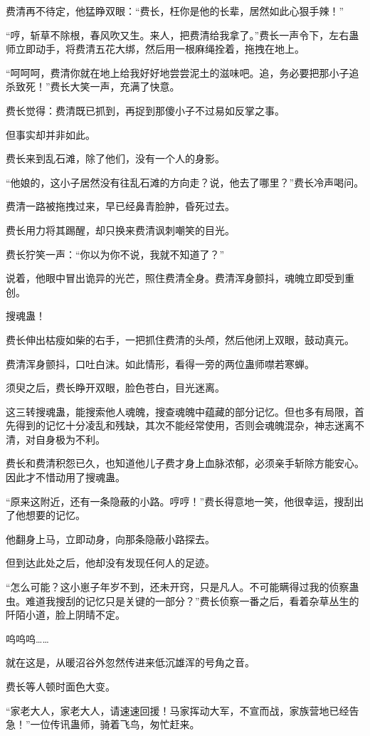 \begin{this_body}
费清再不待定，他猛睁双眼：“费长，枉你是他的长辈，居然如此心狠手辣！”

“哼，斩草不除根，春风吹又生。来人，把费清给我拿了。”费长一声令下，左右蛊师立即动手，将费清五花大绑，然后用一根麻绳拴着，拖拽在地上。

“呵呵呵，费清你就在地上给我好好地尝尝泥土的滋味吧。追，务必要把那小子追杀致死！”费长大笑一声，充满了快意。

费长觉得：费清既已抓到，再捉到那傻小子不过易如反掌之事。

但事实却并非如此。

费长来到乱石滩，除了他们，没有一个人的身影。

“他娘的，这小子居然没有往乱石滩的方向走？说，他去了哪里？”费长冷声喝问。

费清一路被拖拽过来，早已经鼻青脸肿，昏死过去。

费长用力将其踢醒，却只换来费清讽刺嘲笑的目光。

费长狞笑一声：“你以为你不说，我就不知道了？”

说着，他眼中冒出诡异的光芒，照住费清全身。费清浑身颤抖，魂魄立即受到重创。

搜魂蛊！

费长伸出枯瘦如柴的右手，一把抓住费清的头颅，然后他闭上双眼，鼓动真元。

费清浑身颤抖，口吐白沫。如此情形，看得一旁的两位蛊师噤若寒蝉。

须臾之后，费长睁开双眼，脸色苍白，目光迷离。

这三转搜魂蛊，能搜索他人魂魄，搜查魂魄中蕴藏的部分记忆。但也多有局限，首先得到的记忆十分凌乱和残缺，其次不能经常使用，否则会魂魄混杂，神志迷离不清，对自身极为不利。

费长和费清积怨已久，也知道他儿子费才身上血脉浓郁，必须亲手斩除方能安心。因此才不惜动用了搜魂蛊。

“原来这附近，还有一条隐蔽的小路。哼哼！”费长得意地一笑，他很幸运，搜刮出了他想要的记忆。

他翻身上马，立即动身，向那条隐蔽小路探去。

但到达此处之后，他却没有发现任何人的足迹。

“怎么可能？这小崽子年岁不到，还未开窍，只是凡人。不可能瞒得过我的侦察蛊虫。难道我搜刮的记忆只是关键的一部分？”费长侦察一番之后，看着杂草丛生的阡陌小道，脸上阴晴不定。

呜呜呜……

就在这是，从暖沼谷外忽然传进来低沉雄浑的号角之音。

费长等人顿时面色大变。

“家老大人，家老大人，请速速回援！马家挥动大军，不宣而战，家族营地已经告急！”一位传讯蛊师，骑着飞鸟，匆忙赶来。


\end{this_body}

